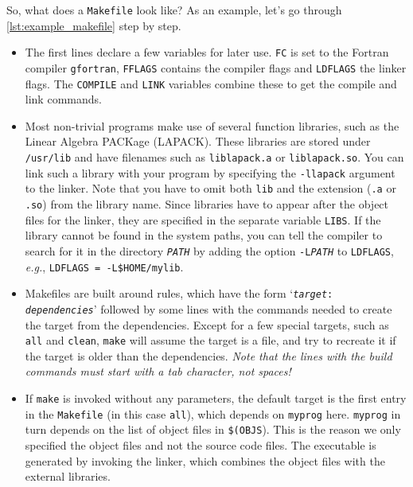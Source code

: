 \documentclass[openany,oneside]{report}
\begin{document}

So, what does a \texttt{Makefile} look like? As an example, let's go through \autoref{lst:example_makefile} step by step.
\begin{itemize}
  \item The first lines declare a few variables for later use.
    \texttt{FC} is set to the Fortran compiler \texttt{gfortran}, \texttt{FFLAGS} contains the compiler flags and \texttt{LDFLAGS} the linker flags.
    The \texttt{COMPILE} and \texttt{LINK} variables combine these to get the compile and link commands.
  \item Most non-trivial programs make use of several function libraries, such as the Linear Algebra PACKage (LAPACK).
    These libraries are stored under \texttt{/usr/lib} and have filenames such as \texttt{liblapack.a} or \texttt{liblapack.so}.
    You can link such a library with your program by specifying the \texttt{-llapack} argument to the linker.
    Note that you have to omit both \texttt{lib} and the extension (\texttt{.a} or \texttt{.so}) from the library name.
    Since libraries have to appear after the object files for the linker, they are specified in the separate variable \texttt{LIBS}.
    If the library cannot be found in the system paths, you can tell the compiler to search for it in the directory \texttt{\emph{PATH}} by adding the option \texttt{-L\emph{PATH}} to \texttt{LDFLAGS}, \emph{e.g.}, \texttt{LDFLAGS = -L\$HOME/mylib}.
  \item Makefiles are built around rules, which have the form `\texttt{\emph{target}: \emph{dependencies}}' followed by some lines with the commands needed to create the target from the dependencies.
    Except for a few special targets, such as \texttt{all} and \texttt{clean}, \texttt{make} will assume the target is a file, and try to recreate it if the target is older than the dependencies.
    \emph{Note that the lines with the build commands must start with a tab character, not spaces!}
  \item If \texttt{make} is invoked without any parameters, the default target is the first entry in the \texttt{Makefile} (in this case \texttt{all}), which depends on \texttt{myprog} here.
    \texttt{myprog} in turn depends on the list of object files in \texttt{\$(OBJS}).
    This is the reason we only specified the object files and not the source code files.
    The executable is generated by invoking the linker, which combines the object files with the external libraries.

\end{itemize}
\end{document}
